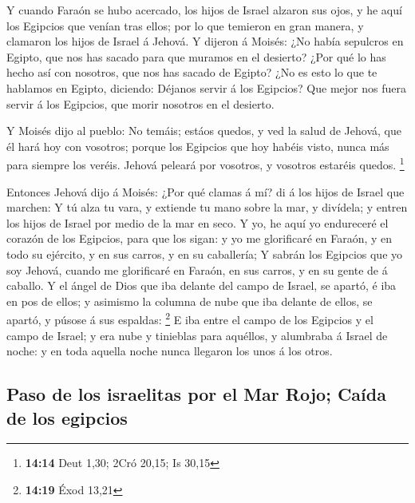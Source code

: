  Y cuando Faraón se hubo acercado, los hijos de Israel
alzaron sus ojos, y he aquí los Egipcios que venían tras ellos; por lo
que temieron en gran manera, y clamaron los hijos de Israel á Jehová.
 Y dijeron á Moisés: ¿No había sepulcros en Egipto, que
nos has sacado para que muramos en el desierto? ¿Por qué lo has hecho
así con nosotros, que nos has sacado de Egipto?  ¿No es
esto lo que te hablamos en Egipto, diciendo: Déjanos servir á los
Egipcios? Que mejor nos fuera servir á los Egipcios, que morir nosotros
en el desierto.

 Y Moisés dijo al pueblo: No temáis; estáos quedos, y ved
la salud de Jehová, que él hará hoy con vosotros; porque los Egipcios
que hoy habéis visto, nunca más para siempre los veréis. 
Jehová peleará por vosotros, y vosotros estaréis quedos. \footnote{\textbf{14:14}
  Deut 1,30; 2Cró 20,15; Is 30,15}

 Entonces Jehová dijo á Moisés: ¿Por qué clamas á mí? di
á los hijos de Israel que marchen:  Y tú alza tu vara, y
extiende tu mano sobre la mar, y divídela; y entren los hijos de Israel
por medio de la mar en seco.  Y yo, he aquí yo endureceré
el corazón de los Egipcios, para que los sigan: y yo me glorificaré en
Faraón, y en todo su ejército, y en sus carros, y en su caballería;
 Y sabrán los Egipcios que yo soy Jehová, cuando me
glorificaré en Faraón, en sus carros, y en su gente de á caballo.
 Y el ángel de Dios que iba delante del campo de Israel,
se apartó, é iba en pos de ellos; y asimismo la columna de nube que iba
delante de ellos, se apartó, y púsose á sus espaldas: \footnote{\textbf{14:19}
  Éxod 13,21}  E iba entre el campo de los Egipcios y el
campo de Israel; y era nube y tinieblas para aquéllos, y alumbraba á
Israel de noche: y en toda aquella noche nunca llegaron los unos á los
otros.

\hypertarget{paso-de-los-israelitas-por-el-mar-rojo-cauxedda-de-los-egipcios}{%
\subsection{Paso de los israelitas por el Mar Rojo; Caída de los
egipcios}\label{paso-de-los-israelitas-por-el-mar-rojo-cauxedda-de-los-egipcios}}


